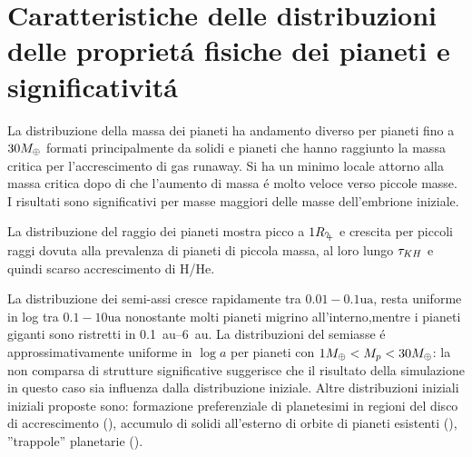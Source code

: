 \clearpage

\section{Caratteristiche delle distribuzioni delle propriet\'a fisiche dei pianeti e significativit\'a}


La distribuzione della massa dei pianeti ha andamento diverso per pianeti fino a $30M_{\oplus}{}$ formati principalmente da solidi e pianeti che hanno raggiunto la massa critica per l'accrescimento di gas runaway.
Si ha un minimo locale attorno alla massa critica dopo di che l'aumento di massa \'e molto veloce verso piccole masse. I risultati sono significativi per masse maggiori delle masse dell'embrione iniziale.

La distribuzione del raggio dei pianeti mostra picco a $1\rjupiter$ e crescita per piccoli raggi dovuta alla prevalenza di pianeti di piccola massa, al loro lungo $\tau_{KH}{}$ e quindi scarso accrescimento di H/He.

La distribuzione dei semi-assi cresce rapidamente tra $0.01-0.1\si{\astronomicalunit}$, resta uniforme in log tra $0.1-10\si{\astronomicalunit}$ nonostante molti pianeti migrino all'interno,mentre i pianeti giganti sono ristretti in \SIrange{0.1}{6}{\astronomicalunit}. La distribuzioni del semiasse \'e approssimativamente uniforme in $\log{a}$ per pianeti con $1M_{\oplus}{}<M_p<30M_{\oplus}{}$: la non comparsa di strutture significative suggerisce che il risultato della simulazione in questo caso sia influenza dalla distribuzione iniziale. Altre distribuzioni iniziali iniziali proposte sono: formazione preferenziale di planetesimi in regioni del disco di accrescimento (\cite{drkazkowska2016close}), accumulo di solidi all'esterno di orbite di pianeti esistenti (\cite{pinilla2015sequential}), ''trappole'' planetarie (\cite{hasegawa2012evolutionary}).

